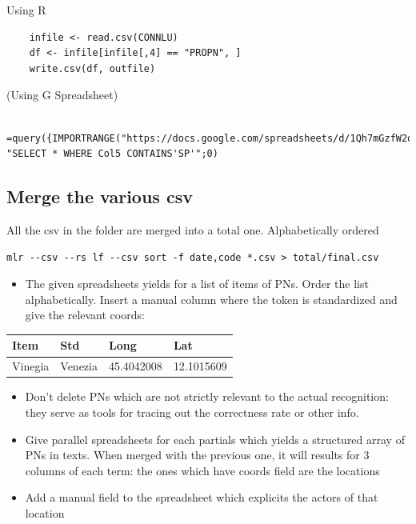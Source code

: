 Using R

\begin{verbatim}
    infile <- read.csv(CONNLU)
    df <- infile[infile[,4] == "PROPN", ]
    write.csv(df, outfile)
\end{verbatim}

(Using G Spreadsheet)

\begin{verbatim}
    =query({IMPORTRANGE("https://docs.google.com/spreadsheets/d/1Qh7mGzfW2ow8RzOniqO_-60JST6pbT71dfzaz_GtV0k";"prova!A1:J15000")}; "SELECT * WHERE Col5 CONTAINS'SP'";0)
\end{verbatim}

\subsection{Merge the various csv}\label{merge-the-various-csv}

All the csv in the folder are merged into a total one. Alphabetically
ordered

\begin{verbatim}
mlr --csv --rs lf --csv sort -f date,code *.csv > total/final.csv
\end{verbatim}

\begin{itemize}
\tightlist
\item
  The given spreadsheets yields for a list of items of PNs. Order the
  list alphabetically. Insert a manual column where the token is
  standardized and give the relevant coords:
\end{itemize}

\begin{longtable}[]{@{}llll@{}}
\toprule
Item & Std & Long & Lat\tabularnewline
\midrule
\endhead
Vinegia & Venezia & 45.4042008 & 12.1015609\tabularnewline
\bottomrule
\end{longtable}

\begin{itemize}
\tightlist
\item
  Don't delete PNs which are not strictly relevant to the actual
  recognition: they serve as tools for tracing out the correctness rate
  or other info.
\item
  Give parallel spreadsheets for each partials which yields a structured
  array of PNs in texts. When merged with the previous one, it will
  results for 3 columns of each term: the ones which have coords field
  are the locations
\item
  Add a manual field to the spreadsheet which explicits the actors of
  that location
\end{itemize}

